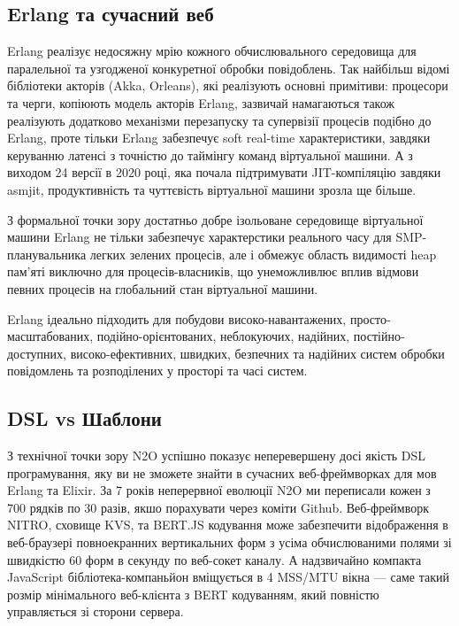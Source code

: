\subsection{Erlang та сучасний веб}

Erlang реалізує недосяжну мрію кожного обчислювального середовища для
паралельної та узгодженої конкуретної обробки повідоблень. Так найбільш
відомі бібліотеки акторів (Akka, Orleans), які реалізують основні примітиви:
процесори та черги, копіюють модель акторів Erlang, зазвичай намагаються
також реалізують додатково механізми перезапуску та супервізії процесів
подібно до Erlang, проте тільки Erlang забезпечує soft real-time характеристики,
завдяки керуванню латенсі з точністю до таймінгу команд віртуальної машини.
А з виходом 24 версії в 2020 році, яка почала підтримувати JIT-компіляцію
завдяки asmjit, продуктивність та чуттєвість віртуальної машини зрозла
ще більше.

З формальної точки зору достатньо добре ізольоване середовище віртуальної
машини Erlang не тільки забезпечує характерстики реального часу для
SMP-планувальника легких зелених процесів, але і обмежує область видимості
heap пам'яті виключно для процесів-власників, що унеможливлює вплив відмови
певних процесів на глобальний стан віртуальної машини.

Erlang ідеально підходить для побудови високо-навантажених,
просто-масштабованих, подійно-орієнтованих, неблокуючих, надійних,
постійно-доступних, високо-ефективних, швидких, безпечних та надійних
систем обробки повідомлень та розподілених у просторі та часі систем.

\subsection{DSL vs Шаблони}

З технічної точки зору N2O успішно показує неперевершену досі якість
DSL програмування, яку ви не зможете знайти в сучасних веб-фреймворках
для мов Erlang та Elixir. За 7 років неперервної еволюції N2O ми переписали
кожен з 700 рядків по 30 разів, якшо порахувати через коміти Github.
Веб-фреймворк NITRO, сховище KVS, та BERT.JS кодування може забезпечити
відображення в веб-браузері повноекранних вертикальних форм з усіма
обчислюваними полями зі швидкістю 60 форм в секунду по веб-сокет каналу.
А надзвичайно компакта JavaScript бібліотека-компаньйон вміщується
в 4 MSS/MTU вікна — саме такий розмір мінімального веб-клієнта з BERT
кодуванням, який повністю управляється зі сторони сервера.


